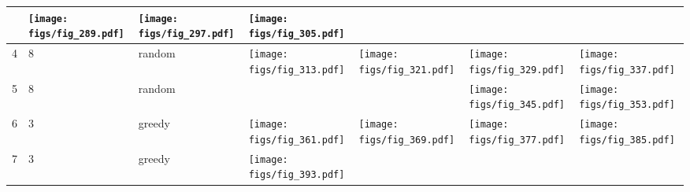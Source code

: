 \documentclass[oneside,canadian,landscape]{article}
\begin{document}
\begin{center}
\begin{longtable}{|l|l|l||l|l|l|l|}
&\begin{minipage}{3.5cm}
\texttt{[image: figs/fig\_289.pdf]}
\end{minipage}
&\begin{minipage}{3.5cm}
\texttt{[image: figs/fig\_297.pdf]}
\end{minipage}
&\begin{minipage}{3.5cm}
\texttt{[image: figs/fig\_305.pdf]}
\end{minipage}
\\ \hline
4&8&random&\begin{minipage}{3.5cm}
\texttt{[image: figs/fig\_313.pdf]}
\end{minipage}
&\begin{minipage}{3.5cm}
\texttt{[image: figs/fig\_321.pdf]}
\end{minipage}
&\begin{minipage}{3.5cm}
\texttt{[image: figs/fig\_329.pdf]}
\end{minipage}
&\begin{minipage}{3.5cm}
\texttt{[image: figs/fig\_337.pdf]}
\end{minipage}
\\ \hline
5&8&random&&&\begin{minipage}{3.5cm}
\texttt{[image: figs/fig\_345.pdf]}
\end{minipage}
&\begin{minipage}{3.5cm}
\texttt{[image: figs/fig\_353.pdf]}
\end{minipage}
\\ \hline
6&3&greedy&\begin{minipage}{3.5cm}
\texttt{[image: figs/fig\_361.pdf]}
\end{minipage}
&\begin{minipage}{3.5cm}
\texttt{[image: figs/fig\_369.pdf]}
\end{minipage}
&\begin{minipage}{3.5cm}
\texttt{[image: figs/fig\_377.pdf]}
\end{minipage}
&\begin{minipage}{3.5cm}
\texttt{[image: figs/fig\_385.pdf]}
\end{minipage}
\\ \hline
7&3&greedy&\begin{minipage}{3.5cm}
\texttt{[image: figs/fig\_393.pdf]}
\end{minipage}
&\begin{minipage}{3.5cm}

\end{minipage}
\end{longtable}
\end{center}
\end{document}
